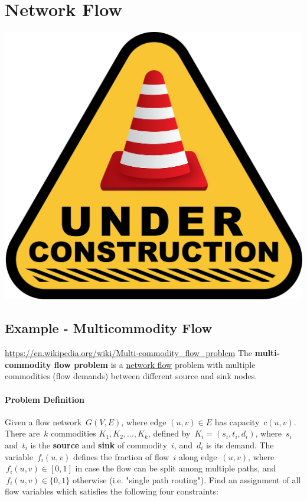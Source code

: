 {\newpage







\section{Network Flow}
\todoSection{}
\begin{center}
\href{https://pixabay.com/illustrations/under-construction-construction-sign-2408060/}{\includegraphics[scale = 0.05]{optimization/figures/under-construction-2408060_1280}}
\end{center}
\subsection{Example - Multicommodity Flow}

\url{https://en.wikipedia.org/wiki/Multi-commodity_flow_problem}
The \textbf{multi-commodity flow problem} is a
\href{flow_network}{network flow} problem with multiple commodities
(flow demands) between different source and sink nodes.

\paragraph{Problem Definition}

Given a flow network \(\,G(V,E)\), where edge \((u,v) \in E\) has
capacity \(\,c(u,v)\). There are \(\,k\) commodities
\(K_1,K_2,\dots,K_k\), defined by \(\,K_i=(s_i,t_i,d_i)\), where
\(\,s_i\) and \(\,t_i\) is the \textbf{source} and \textbf{sink} of
commodity \(\,i\), and \(\,d_i\) is its demand. The variable
\(\,f_i(u,v)\) defines the fraction of flow \(\,i\) along edge
\(\,(u,v)\), where \(\,f_i(u,v) \in [0,1]\) in case the flow can be
split among multiple paths, and \(\,f_i(u,v) \in \{0,1\}\) otherwise
(i.e. "single path routing"). Find an assignment of all flow variables
which satisfies the following four constraints:

}
